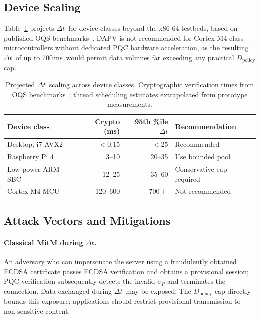 \documentclass[preprint,10pt,3p]{elsarticle}
\newcommand{\Dt}{\ensuremath{\Delta t}}
\newcommand{\ms}{\,ms}
\begin{document}
\subsection{Device Scaling}

Table~\ref{tab:scaling} projects \Dt\ for device classes beyond the x86-64
testbeds, based on published OQS benchmarks~\cite{OQS2017}.  DAPV is not
recommended for Cortex-M4 class microcontrollers without dedicated PQC hardware
acceleration, as the resulting \Dt\ of up to 700\ms\ would permit data volumes
far exceeding any practical $D_\text{policy}$ cap.

\begin{table}[htbp]
\centering
\caption{Projected \Dt\ scaling across device classes.
  Cryptographic verification times from OQS benchmarks~\cite{OQS2017};
  thread scheduling estimates extrapolated from prototype measurements.}
\label{tab:scaling}
\small
\begin{tabular}{lrrl}
\toprule
\textbf{Device class} & \textbf{Crypto (ms)} & \textbf{95th \%ile \Dt} &
  \textbf{Recommendation} \\
\midrule
Desktop, i7 AVX2   & $<$0.15   & $<$25    & Recommended \\
Raspberry Pi 4     & 3--10     & 20--35   & Use bounded pool \\
Low-power ARM SBC  & 12--25    & 35--60   & Conservative cap required \\
Cortex-M4 MCU      & 120--600  & $700+$   & Not recommended \\
\bottomrule
\end{tabular}
\end{table}

\subsection{Attack Vectors and Mitigations}

\paragraph{Classical MitM during \Dt.}
An adversary who can impersonate the server using a fraudulently obtained ECDSA
certificate passes ECDSA verification and obtains a provisional session; PQC
verification subsequently detects the invalid $\sigma_P$ and terminates the
connection.  Data exchanged during \Dt\ may be exposed.  The $D_\text{policy}$
cap directly bounds this exposure; applications should restrict provisional
transmission to non-sensitive content.
\end{document}
